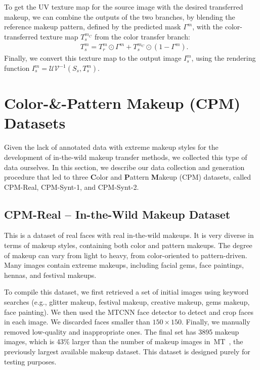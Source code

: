 \documentclass[final]{cvpr}
\begin{document}
To get the UV texture map for the source image with the desired transferred makeup, we can combine the outputs of the two branches, by blending the reference makeup pattern, defined by the predicted mask $\Gamma^{m}$, with the color-transferred texture map $T_{s}^{m_C}$ from the color transfer branch:
\begin{align}
    & T_{s}^{m} = T_{r}^{m} \odot \Gamma^{m} + T_{s}^{m_C} \odot (1 - \Gamma^{m}).
\end{align}
Finally, we convert this texture map to the output image $I_{s}^{m}$, using the rendering function $I_{s}^{m} = \mathcal{UV}^{-1}(S_{s}, T_{s}^{m})$.

\section{Color-\&-Pattern Makeup (CPM) Datasets}
\vspace{-2mm}


Given the lack of annotated data with extreme makeup styles for the development of in-the-wild makeup transfer methods, we collected this type of data ourselves. In this section, we describe our data collection and generation procedure that led to three \textbf{C}olor and \textbf{P}attern \textbf{M}akeup (CPM) datasets, called CPM-Real, CPM-Synt-1, and CPM-Synt-2.



\subsection{CPM-Real -- In-the-Wild Makeup Dataset}
\vspace{-2mm}


This is a dataset of real faces with real in-the-wild makeups. It is very diverse in terms of makeup styles, containing both color and pattern makeups. The degree of makeup can vary from light to heavy, from color-oriented to pattern-driven. Many images contain extreme makeups, including facial gems, face paintings, hennas, and festival makeups.






To compile this dataset, we first retrieved a set of initial images using keyword searches (e.g., glitter makeup, festival makeup, creative makeup, gems makeup, face painting). We then used the MTCNN face detector \cite{zhang2016joint} to detect and crop faces in each image. We discarded faces smaller than $150{\times}150$. Finally, we manually removed low-quality and inappropriate ones.
The final set has 3895 makeup images, which is 43\% larger than the number of makeup images in~MT~\cite{beautygan}, the previously largest available makeup dataset. This dataset is designed purely for testing purposes.
\end{document}
